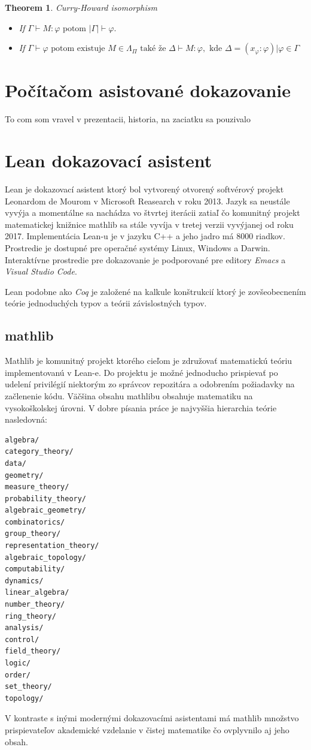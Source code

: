 \documentclass[a4paper,10pt,oneside]{report}%
\newtheorem{theorem}{Theorem}
\begin{document}
\begin{theorem}{Curry-Howard isomorphism}
    \begin{itemize}
        \item If $\Gamma \vdash M : \varphi \textrm{ potom } |\Gamma|  \vdash \varphi.$
        \item If $\Gamma \vdash \varphi \textrm{ potom existuje } M \in \Lambda_{\Pi}
            \textrm{ také že } \Delta \vdash M : \varphi, \textrm{ kde }
            \Delta = { ( x_{\varphi} : \varphi ) | \varphi \in \Gamma }$
    \end{itemize}
\end{theorem}

\section{Počítačom asistované dokazovanie}
    To com som vravel v prezentacii, historia, na zaciatku sa pouzivalo
\section{Lean dokazovací asistent}
    Lean je dokazovací asistent ktorý bol vytvorený otvorený softvérový projekt
Leonardom de Mourom v Microsoft Reasearch v roku 2013.
    Jazyk sa neustále vyvýja a momentálne sa nachádza vo štvrtej iterácii \cite{lean4} zatiaľ čo komunitný projekt matematickej knižnice mathlib sa stále vyvíja v tretej verzii\cite{lean3} vyvýjanej od roku 2017.
    Implementácia Lean-u je v jazyku C++ a jeho jadro má 8000 riadkov.
    Prostredie je dostupné pre operačné systémy Linux, Windows a Darwin.
    Interaktívne prostredie pre dokazovanie je podporované pre editory \emph{Emacs} a \emph{Visual Studio Code}.

    Lean podobne ako \emph{Coq} je založené na kalkule konštrukcií ktorý je zovšeobecnením teórie jednoduchých typov
    a teórii závislostných typov.
\subsection{mathlib}
    Mathlib je komunitný projekt\cite{mathlib} ktorého cieľom je združovať matematickú
teóriu implementovanú v Lean-e.
    Do projektu je možné jednoducho prispievať po udelení privilégií niektorým zo
správcov repozitára a odobrením požiadavky na začlenenie kódu.
    Väčšina obsahu mathlibu obsahuje matematiku na vysokoškolskej úrovni.
    V dobre písania práce je najvyššia hierarchia teórie nasledovná:
\begin{lstlisting}
algebra/
category_theory/
data/
geometry/
measure_theory/
probability_theory/
algebraic_geometry/
combinatorics/
group_theory/
representation_theory/
algebraic_topology/
computability/
dynamics/
linear_algebra/
number_theory/
ring_theory/
analysis/
control/
field_theory/
logic/
order/
set_theory/
topology/
\end{lstlisting}
    V kontraste s inými modernými dokazovacími asistentami má mathlib množstvo
prispievateľov akademické vzdelanie v čistej matematike\cite{mathlib_paper} čo
ovplyvnilo aj jeho obsah.
\end{document}
